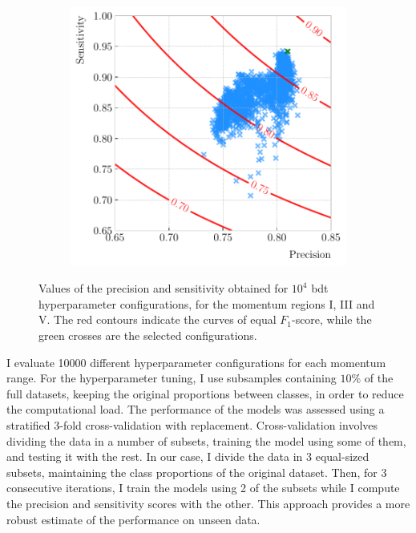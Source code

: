 \begin{figure}[t]
\begin{subfigure}{0.32\textwidth}
	\end{subfigure}
	\begin{subfigure}{0.32\textwidth}
		\centering
		\includegraphics[width=.99\linewidth]{Images/GArSoft_PID/BDT/precision_vs_sensitivity_p0_6.50_sigmap_3.50.pdf}
	\end{subfigure}
	\caption[Values of the precision and sensitivity obtained for $10^{4}$ \gls{bdt} hyperparameter configurations, for the momentum regions I, III and V.]{Values of the precision and sensitivity obtained for $10^{4}$ \gls{bdt} hyperparameter configurations, for the momentum regions I, III and V. The red contours indicate the curves of equal $F_{1}$-score, while the green crosses are the selected configurations.}
	\label{fig:hyper_precision_sensitivity}
\end{figure}

I evaluate 10000 different hyperparameter configurations for each momentum range. For the hyperparameter tuning, I use subsamples containing $10\%$ of the full datasets, keeping the original proportions between classes, in order to reduce the computational load. The performance of the models was assessed using a stratified 3-fold cross-validation with replacement. Cross-validation involves dividing the data in a number of subsets, training the model using some of them, and testing it with the rest. In our case, I divide the data in 3 equal-sized subsets, maintaining the class proportions of the original dataset. Then, for 3 consecutive iterations, I train the models using 2 of the subsets while I compute the precision and sensitivity scores with the other. This approach provides a more robust estimate of the performance on unseen data.

